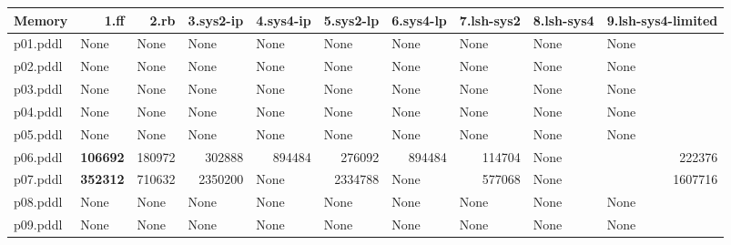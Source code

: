 \documentclass{article}
\begin{document}
\begin{tabular}{@{}lrrrrrrrrr@{}}
Memory & 1.ff & 2.rb & 3.sys2-ip & 4.sys4-ip & 5.sys2-lp & 6.sys4-lp & 7.lsh-sys2 & 8.lsh-sys4 & 9.lsh-sys4-limited \\
\midrule
p01.pddl & \multicolumn{1}{|l|}{None} & \multicolumn{1}{|l|}{None} & \multicolumn{1}{|l|}{None} & \multicolumn{1}{|l|}{None} & \multicolumn{1}{|l|}{None} & \multicolumn{1}{|l|}{None} & \multicolumn{1}{|l|}{None} & \multicolumn{1}{|l|}{None} & \multicolumn{1}{|l|}{None} \\
p02.pddl & \multicolumn{1}{|l|}{None} & \multicolumn{1}{|l|}{None} & \multicolumn{1}{|l|}{None} & \multicolumn{1}{|l|}{None} & \multicolumn{1}{|l|}{None} & \multicolumn{1}{|l|}{None} & \multicolumn{1}{|l|}{None} & \multicolumn{1}{|l|}{None} & \multicolumn{1}{|l|}{None} \\
p03.pddl & \multicolumn{1}{|l|}{None} & \multicolumn{1}{|l|}{None} & \multicolumn{1}{|l|}{None} & \multicolumn{1}{|l|}{None} & \multicolumn{1}{|l|}{None} & \multicolumn{1}{|l|}{None} & \multicolumn{1}{|l|}{None} & \multicolumn{1}{|l|}{None} & \multicolumn{1}{|l|}{None} \\
p04.pddl & \multicolumn{1}{|l|}{None} & \multicolumn{1}{|l|}{None} & \multicolumn{1}{|l|}{None} & \multicolumn{1}{|l|}{None} & \multicolumn{1}{|l|}{None} & \multicolumn{1}{|l|}{None} & \multicolumn{1}{|l|}{None} & \multicolumn{1}{|l|}{None} & \multicolumn{1}{|l|}{None} \\
p05.pddl & \multicolumn{1}{|l|}{None} & \multicolumn{1}{|l|}{None} & \multicolumn{1}{|l|}{None} & \multicolumn{1}{|l|}{None} & \multicolumn{1}{|l|}{None} & \multicolumn{1}{|l|}{None} & \multicolumn{1}{|l|}{None} & \multicolumn{1}{|l|}{None} & \multicolumn{1}{|l|}{None} \\
p06.pddl & \textbf{106692} & 180972 & 302888 & 894484 & 276092 & 894484 & 114704 & \multicolumn{1}{|l|}{None} & 222376 \\
p07.pddl & \textbf{352312} & 710632 & 2350200 & \multicolumn{1}{|l|}{None} & 2334788 & \multicolumn{1}{|l|}{None} & 577068 & \multicolumn{1}{|l|}{None} & 1607716 \\
p08.pddl & \multicolumn{1}{|l|}{None} & \multicolumn{1}{|l|}{None} & \multicolumn{1}{|l|}{None} & \multicolumn{1}{|l|}{None} & \multicolumn{1}{|l|}{None} & \multicolumn{1}{|l|}{None} & \multicolumn{1}{|l|}{None} & \multicolumn{1}{|l|}{None} & \multicolumn{1}{|l|}{None} \\
p09.pddl & \multicolumn{1}{|l|}{None} & \multicolumn{1}{|l|}{None} & \multicolumn{1}{|l|}{None} & \multicolumn{1}{|l|}{None} & \multicolumn{1}{|l|}{None} & \multicolumn{1}{|l|}{None} & \multicolumn{1}{|l|}{None} & \multicolumn{1}{|l|}{None} & \multicolumn{1}{|l|}{None} \\

\end{tabular}
\end{document}
